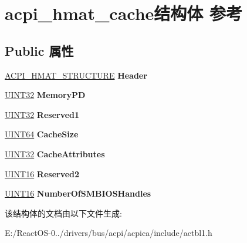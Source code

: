 \hypertarget{structacpi__hmat__cache}{}\section{acpi\+\_\+hmat\+\_\+cache结构体 参考}
\label{structacpi__hmat__cache}
\subsection*{Public 属性}
\begin{DoxyCompactItemize}
\item 
\mbox{\label{structacpi__hmat__cache_a75d253e6ddcd7958c43b5f014b9641de}} 
\hyperlink{structacpi__hmat__structure}{A\+C\+P\+I\+\_\+\+H\+M\+A\+T\+\_\+\+S\+T\+R\+U\+C\+T\+U\+RE} {\bfseries Header}
\item 
\mbox{\label{structacpi__hmat__cache_a1c7566f134698827a45edf39dc591930}} 
\hyperlink{_processor_bind_8h_ae1e6edbbc26d6fbc71a90190d0266018}{U\+I\+N\+T32} {\bfseries Memory\+PD}
\item 
\mbox{\label{structacpi__hmat__cache_aba832bd58bfe2e9c3c5a1b6b6d0155be}} 
\hyperlink{_processor_bind_8h_ae1e6edbbc26d6fbc71a90190d0266018}{U\+I\+N\+T32} {\bfseries Reserved1}
\item 
\mbox{\label{structacpi__hmat__cache_afb49e925387a4ad0bcd50d2eb1a3e3f8}} 
\hyperlink{_processor_bind_8h_a57be03562867144161c1bfee95ca8f7c}{U\+I\+N\+T64} {\bfseries Cache\+Size}
\item 
\mbox{\label{structacpi__hmat__cache_a7d3b38a63b7bb6af0c757fb55b8a6c87}} 
\hyperlink{_processor_bind_8h_ae1e6edbbc26d6fbc71a90190d0266018}{U\+I\+N\+T32} {\bfseries Cache\+Attributes}
\item 
\mbox{\label{structacpi__hmat__cache_ab726cb5d09c19bb982e5f2cd58f6d4c2}} 
\hyperlink{_processor_bind_8h_a09f1a1fb2293e33483cc8d44aefb1eb1}{U\+I\+N\+T16} {\bfseries Reserved2}
\item 
\mbox{\label{structacpi__hmat__cache_acd6b66e672ac040ac504e9801f8e5949}} 
\hyperlink{_processor_bind_8h_a09f1a1fb2293e33483cc8d44aefb1eb1}{U\+I\+N\+T16} {\bfseries Number\+Of\+S\+M\+B\+I\+O\+S\+Handles}
\end{DoxyCompactItemize}


该结构体的文档由以下文件生成\+:\begin{DoxyCompactItemize}
\item 
E\+:/\+React\+O\+S-\/0../drivers/bus/acpi/acpica/include/actbl1.\+h\end{DoxyCompactItemize}
